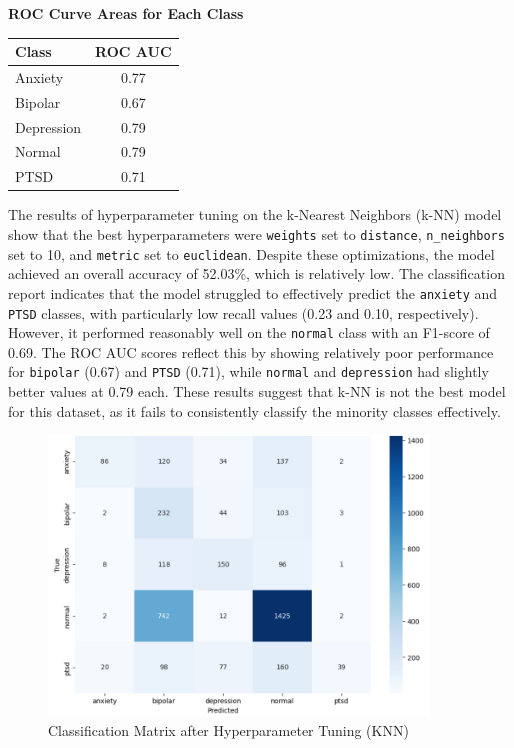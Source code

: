 \begin{center}
    \textbf{ROC Curve Areas for Each Class} \\[0.5em]
    \begin{tabular}{|l|c|}
        \hline
        \textbf{Class}  & \textbf{ROC AUC} \\ \hline
        Anxiety         & 0.77            \\ \hline
        Bipolar         & 0.67            \\ \hline
        Depression      & 0.79            \\ \hline
        Normal          & 0.79            \\ \hline
        PTSD            & 0.71            \\ \hline
    \end{tabular}
\end{center}

\noindent
The results of hyperparameter tuning on the k-Nearest Neighbors (k-NN) model show that the best hyperparameters were \texttt{weights} set to \texttt{distance}, \texttt{n\_neighbors} set to 10, and \texttt{metric} set to \texttt{euclidean}. Despite these optimizations, the model achieved an overall accuracy of 52.03\%, which is relatively low. The classification report indicates that the model struggled to effectively predict the \texttt{anxiety} and \texttt{PTSD} classes, with particularly low recall values (0.23 and 0.10, respectively). However, it performed reasonably well on the \texttt{normal} class with an F1-score of 0.69. The ROC AUC scores reflect this by showing relatively poor performance for \texttt{bipolar} (0.67) and \texttt{PTSD} (0.71), while \texttt{normal} and \texttt{depression} had slightly better values at 0.79 each. These results suggest that k-NN is not the best model for this dataset, as it fails to consistently classify the minority classes effectively. 


\begin{figure}[h!]  
    \centering
    \includegraphics[width=0.9\textwidth]{Images/HP KNN CM.png}  
    \caption{Classification Matrix after Hyperparameter Tuning (KNN)}
    \label{LSTMROC4}  %
\end{figure}

